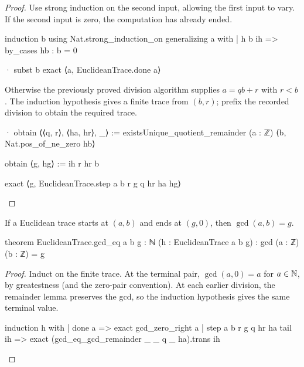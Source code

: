 \begin{proof}

  Use strong induction on the second input, allowing the first input to vary.
  If the second input is zero, the computation has already ended.

  \begin{lean}
    induction b using Nat.strong_induction_on generalizing a with
    | h b ih =>
      by_cases hb : b = 0

      · subst b
        exact ⟨a, EuclideanTrace.done a⟩
  \end{lean}

  Otherwise the previously proved division algorithm supplies $a=qb+r$ with $r<b$.
  The induction hypothesis gives a finite trace from $(b,r)$; prefix the recorded division to
  obtain the required trace.

  \begin{lean}
    · obtain ⟨⟨q, r⟩, ⟨ha, hr⟩, _⟩ :=
        existsUnique_quotient_remainder (a : ℤ) ⟨b, Nat.pos_of_ne_zero hb⟩

      obtain ⟨g, hg⟩ := ih r hr b

      exact ⟨g, EuclideanTrace.step a b r g q hr ha hg⟩
  \end{lean}

\end{proof}

\begin{theorem}
  \label{ent:thm:euclidean-correctness}
  If a Euclidean trace starts at $(a,b)$ and ends at $(g,0)$, then $\gcd(a,b)=g$.

  \begin{lean}
    theorem EuclideanTrace.gcd_eq {a b g : ℕ} (h : EuclideanTrace a b g) :
        gcd (a : ℤ) (b : ℤ) = g
  \end{lean}
\end{theorem}

\begin{proof}

  Induct on the finite trace.
  At the terminal pair, $\gcd(a,0)=a$ for $a\in\mathbb{N}$, by greatestness (and the zero-pair convention).
  At each earlier division, the remainder lemma preserves the gcd, so the induction hypothesis
  gives the same terminal value.

  \begin{lean}
    induction h with
    | done a => exact gcd_zero_right a
    | step a b r g q hr ha tail ih =>
      exact (gcd_eq_gcd_remainder _ _ q _ ha).trans ih
  \end{lean}

\end{proof}


